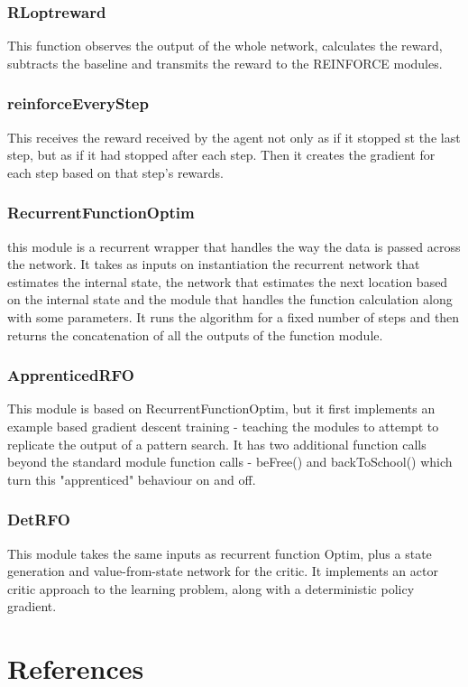 \subsubsection{RLoptreward}%
This function observes the output of the whole network, calculates the reward, subtracts the baseline and transmits the reward to the REINFORCE modules.

\subsubsection{reinforceEveryStep}
This receives the reward received by the agent not only as if it stopped st the last step, but as if it had stopped after each step. Then it creates the gradient for each step based on that step's rewards.
\subsubsection{RecurrentFunctionOptim}
this module is a recurrent wrapper that handles the way the data is passed across the network. It takes as inputs on instantiation the recurrent network that estimates the internal state, the network that estimates the next location based on the internal state and the module that handles the function calculation along with some parameters. It runs the algorithm for a fixed number of steps and then returns the concatenation of all the outputs of the function module.

\subsubsection{ApprenticedRFO}
This module is based on RecurrentFunctionOptim, but it first implements an example based gradient descent training - teaching the modules to attempt to replicate the output of a pattern search. It has two additional function calls beyond the standard module function calls - beFree() and backToSchool() which turn this "apprenticed" behaviour on and off.

\subsubsection{DetRFO}
This module takes the same inputs as recurrent function Optim, plus a state generation and value-from-state network for the critic. It implements an actor critic approach to the learning problem, along with a deterministic policy gradient.



\section{References}
\printbibliography[omitnumbers = false]